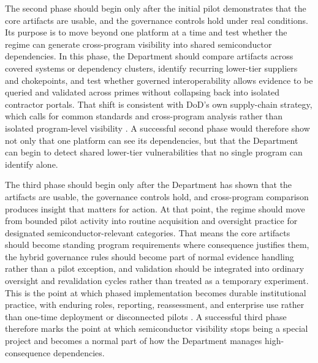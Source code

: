 The second phase should begin only after the initial pilot demonstrates that the core artifacts are usable, and the governance controls hold under real conditions. Its purpose is to move beyond one platform at a time and test whether the regime can generate cross-program visibility into shared semiconductor dependencies. In this phase, the Department should compare artifacts across covered systems or dependency clusters, identify recurring lower-tier suppliers and chokepoints, and test whether governed interoperability allows evidence to be queried and validated across primes without collapsing back into isolated contractor portals. That shift is consistent with DoD's own supply-chain strategy, which calls for common standards and cross-program analysis rather than isolated program-level visibility \parencite{ch5_dod2022_supplychains}. A successful second phase would therefore show not only that one platform can see its dependencies, but that the Department can begin to detect shared lower-tier vulnerabilities that no single program can identify alone.

The third phase should begin only after the Department has shown that the artifacts are usable, the governance controls hold, and cross-program comparison produces insight that matters for action. At that point, the regime should move from bounded pilot activity into routine acquisition and oversight practice for designated semiconductor-relevant categories. That means the core artifacts should become standing program requirements where consequence justifies them, the hybrid governance rules should become part of normal evidence handling rather than a pilot exception, and validation should be integrated into ordinary oversight and revalidation cycles rather than treated as a temporary experiment. This is the point at which phased implementation becomes durable institutional practice, with enduring roles, reporting, reassessment, and enterprise use rather than one-time deployment or disconnected pilots \parencite{ch5_nist800161r1upd1,ch5_dbb2025_illumination}. A successful third phase therefore marks the point at which semiconductor visibility stops being a special project and becomes a normal part of how the Department manages high-consequence dependencies.

